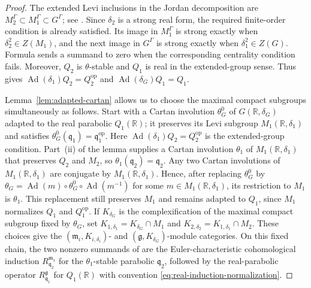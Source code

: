 \documentclass[10pt]{amsart}
\numberwithin{equation}{section}
\theoremstyle{plain}
\theoremstyle{definition}
\theoremstyle{remark}
\newcommand{\RR}{\mathbb R}
\newcommand{\fg}{\mathfrak g}
\newcommand{\fm}{\mathfrak m}
\newcommand{\fq}{\mathfrak q}
\begin{document}
\begin{proof}
The extended Levi inclusions in the Jordan decomposition are
$M_2^\Gamma\subset M_1^\Gamma\subset G^\Gamma$;
see \cite[Definition~4.1.1(5),(7)]{AIMV26}. Since $\delta_2$ is a strong
real form, the required finite-order condition is already satisfied.
Its image in $M_1^\Gamma$ is strong exactly when
$\delta_2^2\in Z(M_1)$, and the next image in $G^\Gamma$ is strong
exactly when $\delta_1^2\in Z(G)$. Formula \cite[(2.6.1)]{AIMV26}
sends a summand to zero when the corresponding centrality condition
fails. Moreover, $Q_2$ is $\theta$-stable and $Q_1$ is real in the
extended-group sense.
Thus \cite[Lemma~2.6.1]{AIMV26} gives
$\operatorname{Ad}(\delta_1)Q_2=Q_2^{\mathrm{op}}$ and
$\operatorname{Ad}(\delta_G)Q_1=Q_1$.

Lemma~\ref{lem:adapted-cartan} allows us to choose the maximal compact
subgroups simultaneously as follows.
Start with a Cartan involution $\theta_G^0$ of
$G(\RR,\delta_G)$ adapted to the real parabolic $Q_1(\RR)$; it preserves
its Levi subgroup $M_1(\RR,\delta_1)$ and satisfies
$\theta_G^0(\fq_1)=\fq_1^{\mathrm{op}}$. Here
$\operatorname{Ad}(\delta_1)Q_2=Q_2^{\mathrm{op}}$ is the extended-group
condition. Part~\textup{(ii)} of the lemma supplies a Cartan
involution $\theta_1$ of $M_1(\RR,\delta_1)$ that preserves $Q_2$ and
$M_2$, so $\theta_1(\fq_2)=\fq_2$. Any two Cartan
involutions of $M_1(\RR,\delta_1)$ are conjugate
by $M_1(\RR,\delta_1)$. Hence, after replacing $\theta_G^0$ by
$\theta_G=\operatorname{Ad}(m)\circ\theta_G^0\circ
\operatorname{Ad}(m^{-1})$ for some $m\in M_1(\RR,\delta_1)$,
its restriction to $M_1$ is $\theta_1$. This replacement still preserves
$M_1$ and remains adapted to $Q_1$, since $M_1$ normalizes $Q_1$ and
$Q_1^{\mathrm{op}}$. If $K_{\delta_G}$ is the complexification of the
maximal compact subgroup fixed by $\theta_G$, set
$K_{1,\delta_1}=K_{\delta_G}\cap M_1$ and
$K_{2,\delta_2}=K_{1,\delta_1}\cap M_2$.
These choices give the $(\fm_i,K_{i,\delta_i})$- and
$(\fg,K_{\delta_G})$-module categories. On this fixed chain, the two nonzero summands of
\cite[(2.6.1)]{AIMV26} are the Euler-characteristic cohomological
induction $R_{\fq_2}^{\fm_1}$ for the $\theta_1$-stable parabolic
$\fq_2$, followed by the real-parabolic operator
$R_{\fq_1}^{\fg}$ for $Q_1(\RR)$ with
convention \eqref{eq:real-induction-normalization}.
\end{proof}
\end{document}
